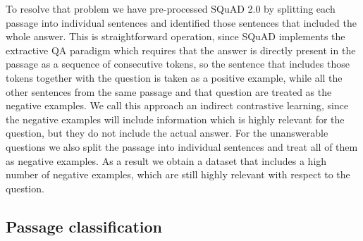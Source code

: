 To resolve that problem we have pre-processed SQuAD 2.0 by splitting each passage into individual sentences and identified
those sentences that included the whole answer. This is straightforward operation, since SQuAD implements the extractive
QA paradigm which requires that the answer is directly present in the passage as a sequence of consecutive tokens,
so the sentence that includes those tokens together with the question is taken as a positive example, while
all the other sentences from the same passage and that question are treated as the negative examples.
We call this approach an indirect contrastive learning, since the negative examples will include information 
which is highly relevant for the question, but they do not include the actual answer. For the unanswerable questions
we also split the passage into individual sentences and treat all of them as negative examples. As a result we 
obtain a dataset that includes a high number of negative examples, which are still highly relevant with respect to the 
question.

\subsection{Passage classification}
